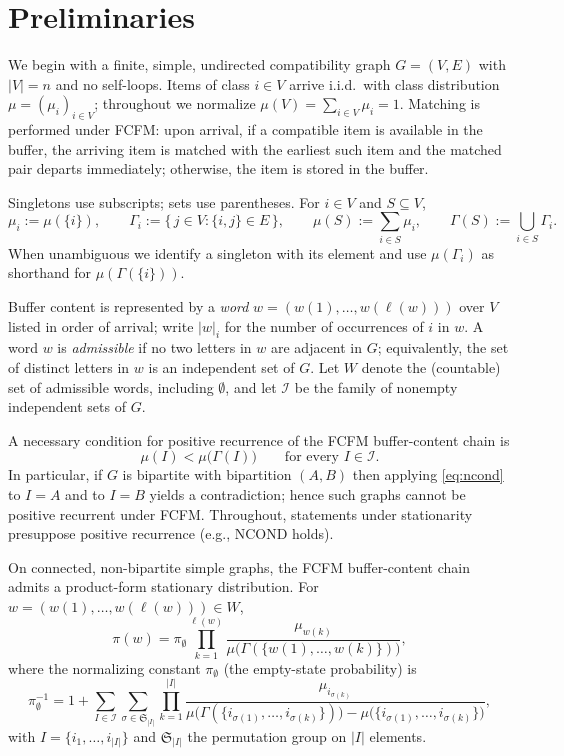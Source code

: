 \documentclass[11pt]{article}
\begin{document}
{\section{Preliminaries}\label{sec:prelim}

We begin with a finite, simple, undirected compatibility graph $G=(V,E)$ with $|V|=n$ and no self-loops.
Items of class $i\in V$ arrive i.i.d.\ with class distribution $\mu=(\mu_i)_{i\in V}$; throughout we normalize $\mu(V)=\sum_{i\in V}\mu_i=1$.
Matching is performed under \textsc{FCFM}: upon arrival, if a compatible item is available in the buffer, the arriving item is matched with the earliest such item and the matched pair departs immediately; otherwise, the item is stored in the buffer.

Singletons use subscripts; sets use parentheses. For $i\in V$ and $S\subseteq V$,
\[
\mu_i:=\mu(\{i\}),\qquad 
\Gamma_i:=\{\,j\in V:\{i,j\}\in E\,\},\qquad
\mu(S):=\sum_{i\in S}\mu_i,\qquad 
\Gamma(S):=\bigcup_{i\in S}\Gamma_i.
\]
When unambiguous we identify a singleton with its element and use $\mu(\Gamma_i)$ as shorthand for $\mu(\Gamma(\{i\}))$.

Buffer content is represented by a \emph{word} $w=(w(1),\ldots,w(\ell(w)))$ over $V$ listed in order of arrival; write $|w|_i$ for the number of occurrences of $i$ in $w$.
A word $w$ is \emph{admissible} if no two letters in $w$ are adjacent in $G$; equivalently, the set of distinct letters in $w$ is an independent set of $G$.
Let $W$ denote the (countable) set of admissible words, including $\emptyset$, and let $\mathcal{I}$ be the family of nonempty independent sets of $G$.

A necessary condition for positive recurrence of the \textsc{FCFM} buffer-content chain is
\begin{equation}\label{eq:ncond}
\mu(I)<\mu\bigl(\Gamma(I)\bigr)\qquad\text{for every } I\in\mathcal{I}. 
\end{equation}
In particular, if $G$ is bipartite with bipartition $(A,B)$ then applying \eqref{eq:ncond} to $I=A$ and to $I=B$ yields a contradiction; hence such graphs cannot be positive recurrent under \textsc{FCFM}.
Throughout, statements under stationarity presuppose positive recurrence (e.g., \textsc{NCOND} holds).

On connected, non-bipartite simple graphs, the \textsc{FCFM} buffer-content chain admits a product-form stationary distribution.
For $w=(w(1),\ldots,w(\ell(w)))\in W$,
\begin{equation}\label{eq:product-form}
\pi(w)=\pi_{\emptyset}\prod_{k=1}^{\ell(w)}
\frac{\mu_{w(k)}}{\mu\bigl(\Gamma(\{w(1),\ldots,w(k)\})\bigr)},
\end{equation}
where the normalizing constant $\pi_{\emptyset}$ (the empty-state probability) is
\begin{equation}\label{eq:pi0-general}
\pi_{\emptyset}^{-1}=1+\sum_{I\in\mathcal{I}}\sum_{\sigma\in \mathfrak{S}_{|I|}}\prod_{k=1}^{|I|}
\frac{\mu_{i_{\sigma(k)}}}{\mu\bigl(\Gamma(\{i_{\sigma(1)},\ldots,i_{\sigma(k)}\})\bigr)-\mu\bigl(\{i_{\sigma(1)},\ldots,i_{\sigma(k)}\}\bigr)},
\end{equation}
with $I=\{i_1,\ldots,i_{|I|}\}$ and $\mathfrak{S}_{|I|}$ the permutation group on $|I|$ elements.

}
\end{document}
